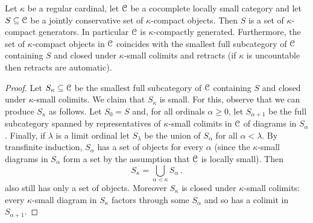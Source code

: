 \begin{proposition}
\label{proposition:criterion-compact-generation}%
Let $\kappa$ be a regular cardinal, let $\mathcal C$ be a cocomplete locally small category and let $S\subseteq \mathcal C$ be a jointly conservative set of $\kappa$-compact objects. Then $S$ is a set of $\kappa$-compact generators. In particular $\mathcal C$ is $\kappa$-compactly generated. Furthermore, the set of $\kappa$-compact objects in $\mathcal C$ coincides with the smallest full subcategory of $\mathcal C$ containing $S$ and closed under $\kappa$-small colimits and retracts (if $\kappa$ is uncountable then retracts are automatic).
\end{proposition}
\begin{proof}
Let $S_{\kappa} \subseteq \mathcal C$ be the smallest full subcategory of $\mathcal C$ containing $S$ and closed under $\kappa$-small colimits. We claim that $S_{\kappa}$ is small. For this, observe that we can produce $S_{\kappa}$ as follows.
Let $S_0=S$ and, for all ordinals $\alpha\ge 0$, let $S_{\alpha+1}$ be the full subcategory spanned by representatives of $\kappa$-small colimits in $\mathcal C$ of diagrams in $S_\alpha$. Finally, if $\lambda$ is a limit ordinal let $S_\lambda$ be the union of $S_\alpha$ for all $\alpha<\lambda$. By transfinite induction, $S_\alpha$ has a set of objects for every $\alpha$ (since the $\kappa$-small diagrams in $S_{\alpha}$ form a set by the assumption that $\mathcal C$ is locally small). Then 
\[
S_\kappa = \bigcup_{\alpha<\kappa} S_\alpha\,.
\]
also still has only a set of objects. Moreover $S_\kappa$ is closed under $\kappa$-small colimits: every $\kappa$-small diagram in $S_\kappa$ factors through some $S_\alpha$ and so has a colimit in $S_{\alpha+1}$. 


\end{proof}
